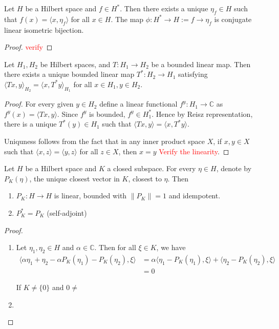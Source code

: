 \begin{theorem}
  Let $H$ be a Hilbert space and $f \in H^*$. Then there exists a
  unique $\eta_f \in H$ such that $f(x) = \langle x , \eta_f \rangle $
  for all $ x \in H$. The map $\phi: H^* \to H := f \to \eta_f$ is
  conjugate linear isometric bijection.
\end{theorem}
\begin{proof}
  \textcolor{red}{verify}
\end{proof}

\begin{theorem}
  Let $H_1, H_2$ be Hilbert spaces, and $T: H_1 \to H_2$ be a bounded
  linear map. Then there exists a unique bounded linear map $T^*: H_2
  \to H_1$ satisfying $\langle  Tx , y \rangle_{H_2} = \langle x ,
  T^*y \rangle_{H_1}$ for all $x \in H_1, y \in H_2$.
\end{theorem}
\begin{proof}
  For every given $y \in H_2$ define a linear functional $f^y: H_1
  \to \mathbb{C}$ as $f^y(x) = \langle Tx , y \rangle$. Since $f^{y}$
  is bounded, $f^y \in H_1^*$. Hence by Reisz representation, there
  is a unique $T^*(y) \in H_1$ such that $\langle  Tx , y \rangle =
  \langle x , T^*y \rangle$.

  Uniquness follows from the fact that in any inner product space
  $X$, if $x, y \in X$ such that $ \langle x , z \rangle = \langle  y
  , z \rangle $ for all $z \in X$, then $x = y$
  \textcolor{red}{Verify the linearity}.
\end{proof}

\begin{theorem}
  Let $H$ be a Hilbert space and $K$ a closed subspace. For every
  $\eta \in H$, denote by $P_K(\eta)$, the unique closest vector in
  $K$, closest to $\eta$. Then
  \begin{enumerate}[label=(\arabic*)]
    \item $P_K: H \to H$ is linear, bounded with $\|P_K\| = 1$ and idempotent.
    \item $P_K^* = P_K$ (self-adjoint)
  \end{enumerate}
\end{theorem}
\begin{proof}
  \begin{enumerate}[label=(\arabic*)]
    \item Let $\eta_1, \eta_2 \in H$ and $\alpha \in \mathbb{C}$.
      Then for all $\xi \in K$, we have
      \begin{align*}
        \langle  \alpha \eta_1
        +\eta_2 - \alpha P_K( \eta_1) - P_K(\eta_2) , \xi \rangle &=
        \alpha \langle \eta_1 - P_K(\eta_1) , \xi  \rangle + \langle
        \eta_2 - P_K(\eta_2) , \xi  \rangle  \\
        &= 0
      \end{align*}

      If $K \neq \{ 0\}$ and $0 \neq $
    \item
  \end{enumerate}
\end{proof}

